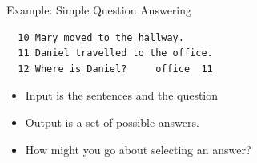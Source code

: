 \documentclass{beamer}
\begin{document}
\begin{frame}[fragile]{Example: Simple Question Answering}
\begin{verbatim}
  10 Mary moved to the hallway.
  11 Daniel travelled to the office.
  12 Where is Daniel?     office  11
\end{verbatim}

  \begin{itemize}
  \item Input is the sentences and the question
    \air 
  \item Output is a set of possible answers.
    \air 
  \item How might you go about selecting an answer?
  \end{itemize}

\end{frame}








  
\end{document}
